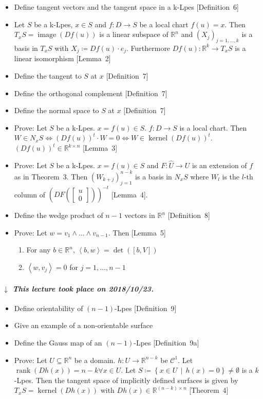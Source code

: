 \documentclass{article}
\numberwithin{lecref}{section}
\newcommand{\SetDef}[2]{\left\{#1\,\mid\,#2\right\}}
\newcommand{\IP}[2]{\left\langle#1, #2\right\rangle}
\DeclareMathOperator{\rank}{rank}
\DeclareMathOperator{\im}{image}
\DeclareMathOperator{\ke}{kernel}
\newcommand{\dateref}[1]{%
  \begin{mdframed}[backgroundcolor=gray!10,innerbottommargin=0pt,innertopmargin=0pt]
    \paragraph{\textit{$\downarrow$ This lecture took place on #1.}}%
  \end{mdframed}%
}
\begin{document}
\begin{itemize}
  \item Define tangent vectors and the tangent space in a k-Lpes [Definition~6]
  \item Let $S$ be a k-Lpes, $x \in S$ and $f: D \to S$ be a local chart $f(u) = x$.
    Then $T_x S = \im(Df(u))$ is a linear subspace of $\mathbb R^n$
    and $(X_j)_{j=1,\dots,k}$ is a basis in $T_xS$ with $X_j \coloneqq Df(u) \cdot e_j$.
    Furthermore $Df(u): \mathbb R^k \to T_xS$ is a linear isomorphism [Lemma~2]
  \item Define the tangent to $S$ at $x$ [Definition~7]
  \item Define the orthogonal complement [Definition~7]
  \item Define the normal space to $S$ at $x$ [Definition~7]
  \item Prove: Let $S$ be a k-Lpes. $x = f(u) \in S$. $f: D \to S$ is a local chart. Then $W \in N_xS \iff (Df(u))^t \cdot W = 0 \iff W \in \ke(Df(u))^t$. $(Df(u))^t \in \mathbb R^{k \times n}$ [Lemma~3]
  \item Prove: Let $S$ be a k-Lpes. $x = f(u) \in S$ and $F: \hat U \to U$ is an extension of $f$ as in Theorem~3. Then $(W_{k+j})_{j=1}^{n-k}$ is a basis in $N_x S$ where $W_l$ is the $l$-th column of $(DF(\begin{bmatrix} u \\ 0 \end{bmatrix}))^{-t}$ [Lemma~4].
  \item Define the wedge product of $n-1$ vectors in $\mathbb R^n$ [Definition~8]
  \item Prove: Let $w = v_1 \wedge \dots \wedge v_{n-1}$. Then [Lemma~5]
    \begin{enumerate}
      \item For any $b \in \mathbb R^n$, $\IP bw = \det([b, V])$
      \item $\IP w{v_{j}} = 0$ for $j = 1, \dots, n-1$
    \end{enumerate}
\end{itemize}

\dateref{2018/10/23}

\begin{itemize}
  \item Define orientability of $(n-1)$-Lpes [Definition~9]
  \item Give an example of a non-orientable surface
  \item Define the Gauss map of an $(n-1)$-Lpes [Definition~9a]
  \item Prove: Let $U \subseteq \mathbb R^n$ be a domain. $h: U \to \mathbb R^{n - k}$ be $\mathcal C^1$.
    Let $\rank(Dh(x)) = n - k \forall x \in U$. Let $S \coloneqq \SetDef{x \in U}{h(x) = 0} \neq \emptyset$ is a $k$-Lpes. Then the tangent space of implicitly defined surfaces is given by $T_x S = \ke(Dh(x))$ with $Dh(x) \in \mathbb R^{(n-k) \times n}$ [Theorem~4]
\end{itemize}
\end{document}
